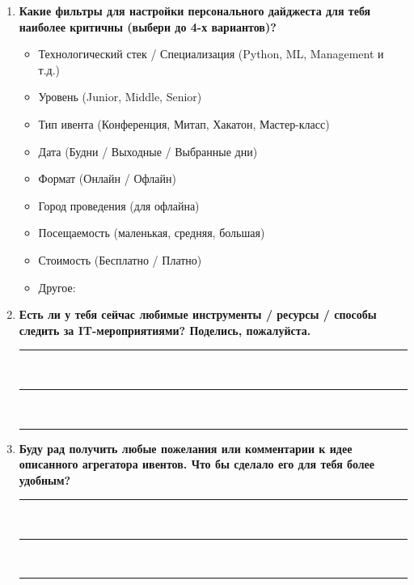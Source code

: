 \begin{enumerate}
    \vspace{1em}

    \item \textbf{Какие фильтры для настройки персонального дайджеста для тебя наиболее критичны (выбери до 4-х вариантов)?}
    \begin{itemize}
        \item[$\square$] Технологический стек / Специализация (Python, ML, Management и т.д.)
        \item[$\square$] Уровень (Junior, Middle, Senior)
        \item[$\square$] Тип ивента (Конференция, Митап, Хакатон, Мастер-класс)
        \item[$\square$] Дата (Будни / Выходные / Выбранные дни)
        \item[$\square$] Формат (Онлайн / Офлайн)
        \item[$\square$] Город проведения (для офлайна)
        \item[$\square$] Посещаемость (маленькая, средняя, большая)
        \item[$\square$] Стоимость (Бесплатно / Платно)
        \item[$\square$] Другое: \hrulefill
    \end{itemize}

    \vspace{1em}

    \item \textbf{Есть ли у тебя сейчас любимые инструменты / ресурсы / способы следить за IT-мероприятиями? Поделись, пожалуйста.}
    \vspace{0.5em} \\
    \rule{\linewidth}{0.5pt} \\
    \rule{\linewidth}{0.5pt} \\
    \rule{\linewidth}{0.5pt}

    \vspace{1em}

    \item \textbf{Буду рад получить любые пожелания или комментарии к идее описанного агрегатора ивентов. Что бы сделало его для тебя более удобным?}
    \vspace{0.5em} \\
    \rule{\linewidth}{0.5pt} \\
    \rule{\linewidth}{0.5pt} \\
    \rule{\linewidth}{0.5pt}


\end{enumerate}
